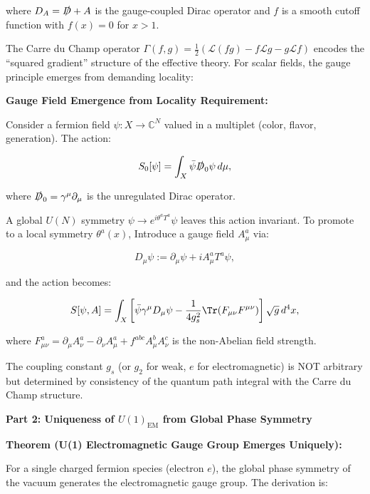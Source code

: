 where $D_A = \slashed{D} + A$ is the gauge-coupled Dirac operator and $f$ is a smooth cutoff function with $f(x) = 0$ for $x > 1$.

The Carre du Champ operator $\Gamma(f, g) = \frac{1}{2}(\mathcal{L}(fg) - f\mathcal{L}g - g\mathcal{L}f)$ encodes the ``squared gradient'' structure of the effective theory. For scalar fields, the gauge principle emerges from demanding locality:

\textbf{Gauge Field Emergence from Locality Requirement:}

Consider a fermion field $\psi: X \to \mathbb{C}^N$ valued in a multiplet (color, flavor, generation). The action:

\begin{equation}
S_0[\psi] = \int_X \bar{\psi} \slashed{D}_0 \psi \, d\mu,
\end{equation}

where $\slashed{D}_0 = \gamma^\mu \partial_\mu$ is the unregulated Dirac operator.

A global $U(N)$ symmetry $\psi \to e^{i\theta^a T^a} \psi$ leaves this action invariant. To promote to a local symmetry $\theta^a(x)$, Introduce a gauge field $A_\mu^a$ via:

\begin{equation}
\label{eq:covariantDerivative}
D_\mu \psi := \partial_\mu \psi + i A_\mu^a T^a \psi,
\end{equation}

and the action becomes:

\begin{equation}
S[\psi, A] = \int_X \left[\bar{\psi} \gamma^\mu D_\mu \psi - \frac{1}{4g_s^2}\Tr(F_{\mu\nu} F^{\mu\nu})\right] \sqrt{g} \, d^4x,
\end{equation}

where $F_{\mu\nu}^a = \partial_\mu A_\nu^a - \partial_\nu A_\mu^a + f^{abc} A_\mu^b A_\nu^c$ is the non-Abelian field strength.

The coupling constant $g_s$ (or $g_2$ for weak, $e$ for electromagnetic) is NOT arbitrary but determined by consistency of the quantum path integral with the Carre du Champ structure.

\textbf{Part 2: Uniqueness of $U(1)_{\text{EM}}$ from Global Phase Symmetry}

\textbf{Theorem (U(1) Electromagnetic Gauge Group Emerges Uniquely):}

For a single charged fermion species (electron $e$), the global phase symmetry of the vacuum generates the electromagnetic gauge group. The derivation is:

